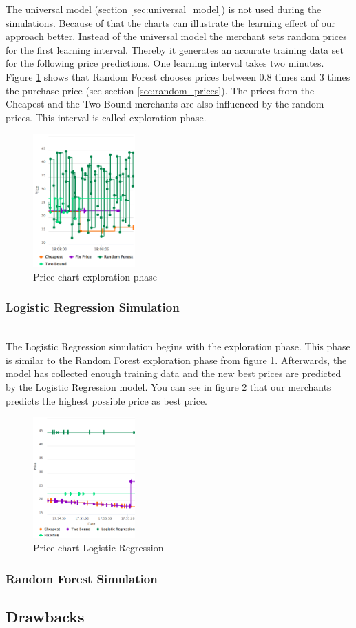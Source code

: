     The universal model (section \ref{sec:universal_model}) is not used during the simulations. Because of that the charts can illustrate the learning effect of our approach better. Instead of the universal model the merchant sets random prices for the first learning interval. Thereby it generates an accurate training data set for the following price predictions. One learning interval takes two minutes. Figure \ref{fig2} shows that Random Forest chooses prices between 0.8 times and 3 times the purchase price (see section \ref{sec:random_prices}). The prices from the Cheapest and the Two Bound merchants are also influenced by the random prices. This interval is called exploration phase.
    
    \begin{figure}[ht]
        \centering
        \includegraphics[width=0.35\textwidth]{img/rndmfrst_explor2.png}
        \caption{Price chart exploration phase}
        \label{fig2}
    \end{figure}
 

\subsubsection{Logistic Regression Simulation}
    ~\\
    The Logistic Regression simulation begins with the exploration phase. This phase is similar to the Random Forest exploration phase from figure \ref{fig2}. Afterwards, the model has collected enough training data and the new best prices are predicted by the Logistic Regression model. You can see in figure \ref{fig3} that our merchants predicts the highest possible price as best price.

    \begin{figure}[ht]
        \centering
      \includegraphics[width=0.35\textwidth]{img/logit_prices.png}
        \caption{Price chart Logistic Regression}
        \label{fig3}
    \end{figure}
 


\subsubsection{Random Forest Simulation}

    
\subsection{Drawbacks}
